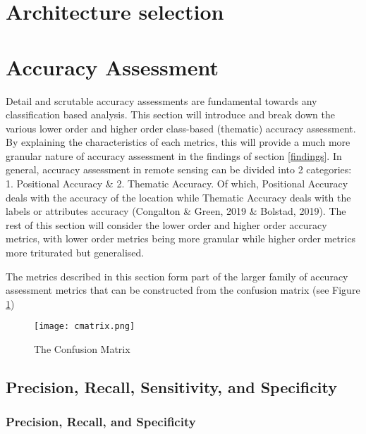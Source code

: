 \documentclass[11pt, a4paper, twoside]{report}
\begin{document}
\section{Architecture selection}\label{Archi}
\section{Accuracy Assessment}\label{AccAss}

Detail and scrutable accuracy assessments are fundamental towards any classification based analysis. This section will introduce and break down the various lower order and higher order class-based (thematic) accuracy assessment. By explaining the characteristics of each metrics, this will provide a much more granular nature of accuracy assessment in the findings of section \ref{findings}. In general, accuracy assessment in remote sensing can be divided into 2 categories: 1. Positional Accuracy \& 2. Thematic Accuracy. Of which, Positional Accuracy deals with the accuracy of the location while Thematic Accuracy deals with the labels or attributes accuracy (Congalton \& Green, 2019 \& Bolstad, 2019). The rest of this section will consider the lower order and higher order accuracy metrics, with lower order metrics being more granular while higher order metrics more triturated but generalised.\\\par

The metrics described in this section form part of the larger family of accuracy assessment metrics that can be constructed from the confusion matrix (see Figure \ref{fig:cmatrix})

\begin{figure}[h]
  \centering
  \texttt{[image: cmatrix.png]}
  \caption{The Confusion Matrix}
  \label{fig:cmatrix}
\end{figure}

\subsection{Precision, Recall, Sensitivity, and Specificity}\label{1storder}
\subsubsection{Precision, Recall, and Specificity}\label{PR&S}
\end{document}
